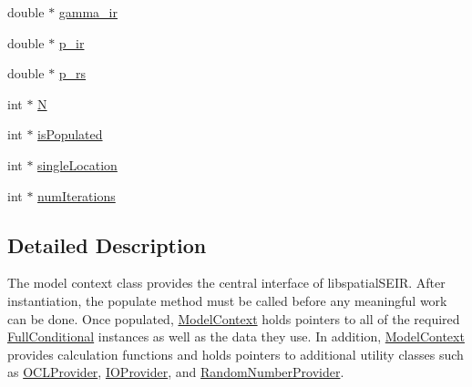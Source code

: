 \begin{DoxyCompactItemize}
double $\ast$ \hyperlink{classSpatialSEIR_1_1ModelContext_a9cbe4ffa8f5b19740f7cffc37d1a7b3c}{gamma\-\_\-ir}
\item 
double $\ast$ \hyperlink{classSpatialSEIR_1_1ModelContext_ad313e395d6c4bc5ca5cbda8c189a67da}{p\-\_\-ir}
\item 
double $\ast$ \hyperlink{classSpatialSEIR_1_1ModelContext_a07133c92757c4de3a525ad921de527d5}{p\-\_\-rs}
\item 
int $\ast$ \hyperlink{classSpatialSEIR_1_1ModelContext_a170b3ee4076d929c5e8012765f825eed}{N}
\item 
int $\ast$ \hyperlink{classSpatialSEIR_1_1ModelContext_a698a8889db239e919323d764775a2148}{is\-Populated}
\item 
int $\ast$ \hyperlink{classSpatialSEIR_1_1ModelContext_a1bf4c4a975e9e060ef30b8c7be14b563}{single\-Location}
\item 
int $\ast$ \hyperlink{classSpatialSEIR_1_1ModelContext_aa8b6063ce0c31c485b42b2de28317ca4}{num\-Iterations}
\end{DoxyCompactItemize}


\subsection{Detailed Description}
The model context class provides the central interface of libspatial\-S\-E\-I\-R. After instantiation, the populate method must be called before any meaningful work can be done. Once populated, \hyperlink{classSpatialSEIR_1_1ModelContext}{Model\-Context} holds pointers to all of the required \hyperlink{classSpatialSEIR_1_1FullConditional}{Full\-Conditional} instances as well as the data they use. In addition, \hyperlink{classSpatialSEIR_1_1ModelContext}{Model\-Context} provides calculation functions and holds pointers to additional utility classes such as \hyperlink{classSpatialSEIR_1_1OCLProvider}{O\-C\-L\-Provider}, \hyperlink{classSpatialSEIR_1_1IOProvider}{I\-O\-Provider}, and \hyperlink{classSpatialSEIR_1_1RandomNumberProvider}{Random\-Number\-Provider}. 

